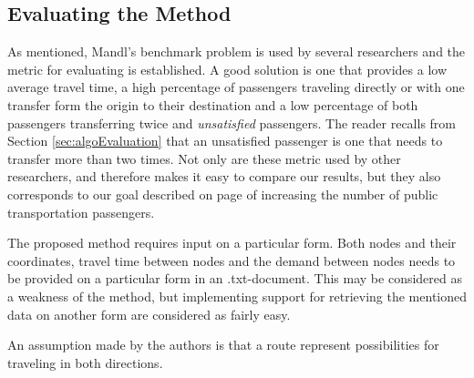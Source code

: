 \subsection{Evaluating the Method}




As mentioned, Mandl's benchmark problem is used by several researchers and the metric for evaluating is established. A good solution is one that provides a low average travel time, a high percentage of passengers traveling directly or with one transfer form the origin to their destination and a low percentage of both passengers transferring twice and \textit{unsatisfied} passengers. The reader recalls from Section \vref{sec:algoEvaluation} that an unsatisfied passenger is one that needs to transfer more than two times. Not only are these metric used by other researchers, and therefore makes it easy to compare our results, but they also corresponds to our goal described on page \pageref{itm:goal} of increasing  the number of public transportation passengers. 

The proposed method requires input on a particular form. Both nodes and their coordinates, travel time between nodes and the demand between nodes needs to be provided on a particular form in an .txt-document. This may be considered as a weakness of the method, but implementing support for retrieving the mentioned data on another form are considered as fairly easy. 

An assumption made by the authors is that a route represent possibilities for traveling in both directions. 

